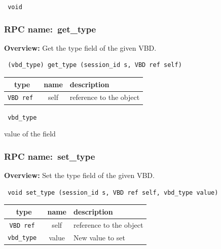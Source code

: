 \vspace{0.3cm}

{\tt 
void
}



\vspace{0.3cm}
\vspace{0.3cm}
\vspace{0.3cm}
\subsubsection{RPC name:~get\_type}

{\bf Overview:} 
Get the type field of the given VBD.

\begin{verbatim} (vbd_type) get_type (session_id s, VBD ref self)\end{verbatim}



 
\vspace{0.3cm}
\begin{tabular}{|c|c|p{7cm}|}
 \hline
{\bf type} & {\bf name} & {\bf description} \\ \hline
{\tt VBD ref } & self & reference to the object \\ \hline 

\end{tabular}

\vspace{0.3cm}

{\tt 
vbd\_type
}


value of the field
\vspace{0.3cm}
\vspace{0.3cm}
\vspace{0.3cm}
\subsubsection{RPC name:~set\_type}

{\bf Overview:} 
Set the type field of the given VBD.

\begin{verbatim} void set_type (session_id s, VBD ref self, vbd_type value)\end{verbatim}



 
\vspace{0.3cm}
\begin{tabular}{|c|c|p{7cm}|}
 \hline
{\bf type} & {\bf name} & {\bf description} \\ \hline
{\tt VBD ref } & self & reference to the object \\ \hline 

{\tt vbd\_type } & value & New value to set \\ \hline 

\end{tabular}

